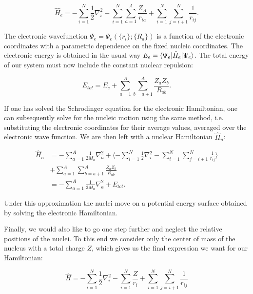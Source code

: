 \begin{equation}
    \hat{H}_e = -\sum_{i=1}^N \frac{1}{2} \nabla_i^2
    -\sum_{i=1}^N \sum_{a=1}^A \frac{Z_A}{r_{ia}}
    +\sum_{i=1}^N \sum_{j=i+1}^N \frac{1}{r_{ij}} .
\end{equation}

The electronic wavefunction $\Psi_e = \Psi_e(\{r_i\}; \{R_a\})$
is a function of the electronic coordinates with a parametric dependence
on the fixed nucleic coordinates. The electronic energy
is obtained in the usual way $E_{e} = \braket{\Psi_e | \hat{H}_e |
\Psi_e} $. The total energy of our system
must now include the constant nuclear repulsion:

$$ E_{tot} = E_{e} + \sum_{a=1}^A \sum_{b=a+1}^A
    \frac{Z_a Z_b}{R_{ab}} . $$

If one has solved the Schrodinger equation for the electronic
Hamiltonian, one can subsequently solve for the nucleic motion
using the same method, i.e. substituting the electronic coordinates
for their average values, averaged over the electronic wave function.
We are then left with a nuclear Hamiltonian $\hat{H}_n$:

\begin{equation}
    \begin{split}
        \hat{H}_n
        &= -\sum_{a=1}^A \frac{1}{2 M_a} \nabla_a^2
        + \langle -\sum_{i=1}^N \frac{1}{2} \nabla_i^2
        - \sum_{i=1}^N \sum_{j=i+1}^N \frac{1}{r_{ij}}
        \rangle \\
        &+ \sum_{a=1}^A \sum_{b=a+1}^A
        \frac{Z_a Z_b}{R_{ab}} \\
        &= -\sum_{a=1}^A \frac{1}{2 M_a} \nabla_a^2
        + E_{tot} .
    \end{split}
\end{equation}

Under this approximation the nuclei move on a potential energy
surface obtained by solving the electronic Hamiltonian.
\par
Finally, we would also like to go one step further and neglect
the relative positions of the nuclei. To this end we consider only the
center of mass of the nucleus with a total charge $Z$,
which gives us the final expression we want for our Hamiltonian:

\begin{equation}
    \hat{H} = -\sum_{i=1}^N \frac{1}{2} \nabla_i^2
    - \sum_{i=1}^N \frac{Z}{r_{i}} + \sum_{i=1}^N \sum_{j=i+1}^N
    \frac{1}{r_{ij}}
\end{equation}

